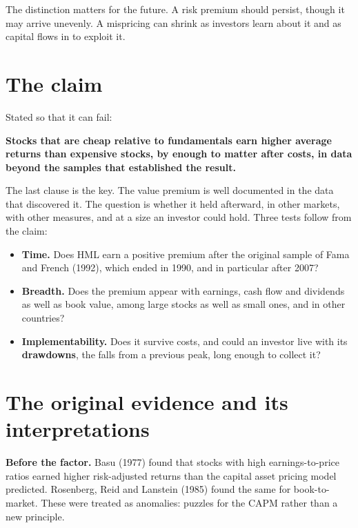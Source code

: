 The distinction matters for the future. A risk premium should persist, though it may arrive unevenly. A mispricing can shrink as investors learn about it and as capital flows in to exploit it.

\section{The claim}
\label{sec:08-claim}

Stated so that it can fail:

\begin{callout}
\textbf{Stocks that are cheap relative to fundamentals earn higher average returns than expensive stocks, by enough to matter after costs, in data beyond the samples that established the result.}
\end{callout}

The last clause is the key. The value premium is well documented in the data that discovered it. The question is whether it held afterward, in other markets, with other measures, and at a size an investor could hold. Three tests follow from the claim:

\begin{itemize}
  \item \textbf{Time.} Does HML earn a positive premium after the original sample of Fama and French (1992), which ended in 1990, and in particular after 2007?
  \item \textbf{Breadth.} Does the premium appear with earnings, cash flow and dividends as well as book value, among large stocks as well as small ones, and in other countries?
  \item \textbf{Implementability.} Does it survive costs, and could an investor live with its \textbf{drawdowns}, the falls from a previous peak, long enough to collect it?
\end{itemize}

\section{The original evidence and its interpretations}
\label{sec:08-evidence}

\textbf{Before the factor.} Basu (1977) found that stocks with high earnings-to-price ratios earned higher risk-adjusted returns than the capital asset pricing model predicted. Rosenberg, Reid and Lanstein (1985) found the same for book-to-market. These were treated as anomalies: puzzles for the CAPM rather than a new principle.

